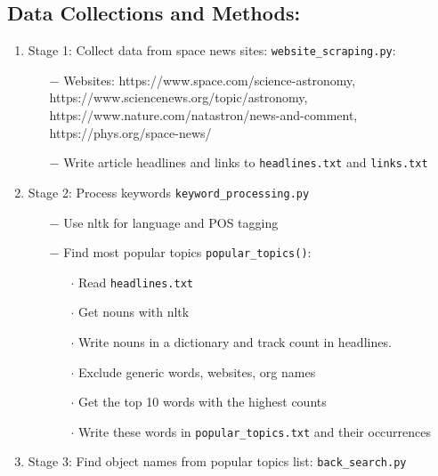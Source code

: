 \documentclass[12pt,letterpaper]{article}
\begin{document}
\subsection*{Data Collections and Methods:}
\begin{enumerate}[leftmargin=*]
    \item Stage 1: Collect data from space news sites:  \texttt{website\_scraping.py}:
        \begin{enumerate}
            \item [$-$] Websites: https://www.space.com/science-astronomy, \\
            https://www.sciencenews.org/topic/astronomy, \\ 
            https://www.nature.com/natastron/news-and-comment, \\ 
            https://phys.org/space-news/
            \item [$-$] Write article headlines and links to \texttt{headlines.txt} and \texttt{links.txt}
        \end{enumerate}
    \item Stage 2: Process keywords \texttt{keyword\_processing.py}
        \begin{enumerate}
            \item [$-$] Use nltk for language and POS tagging
            \item [$-$] Find most popular topics \texttt{popular\_topics()}:
            \begin{enumerate}[leftmargin=*]
                \item[$\cdot$] Read \texttt{headlines.txt}
                \item[$\cdot$]Get nouns with nltk
                \item[$\cdot$]Write nouns in a dictionary and track count in headlines.
                \item[$\cdot$]Exclude generic words, websites, org names
                \item[$\cdot$]Get the top 10 words with the highest counts
                \item[$\cdot$]Write these words in \texttt{popular\_topics.txt} and 
                  their occurrences
            \end{enumerate}
        \end{enumerate}
    \item Stage 3: Find object names from popular topics list:
    \texttt{back\_search.py}
        \begin{enumerate}

\end{enumerate}
\end{enumerate}
\end{document}
